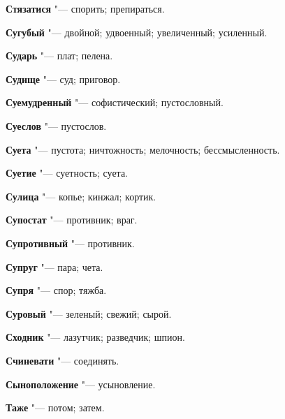 \begin{mymulticols}{2}
\noindent\textbf{Стязатися} "--- спорить; препираться. 




\noindent\textbf{Сугубый} "--- двойной; удвоенный; увеличенный; усиленный. 




\noindent\textbf{Сударь} "--- плат; пелена. 




\noindent\textbf{Судище} "--- суд; приговор. 




\noindent\textbf{Суемудренный} "--- софистический; пустословный. 




\noindent\textbf{Суеслов} "--- пустослов. 




\noindent\textbf{Суета} "--- пустота; ничтожность; мелочность; бессмысленность. 




\noindent\textbf{Суетие} "--- суетность; суета. 




\noindent\textbf{Сулица} "--- копье; кинжал; кортик. 




\noindent\textbf{Супостат} "--- противник; враг. 




\noindent\textbf{Супротивный} "--- противник. 




\noindent\textbf{Супруг} "--- пара; чета. 




\noindent\textbf{Супря} "--- спор; тяжба. 




\noindent\textbf{Суровый} "--- зеленый; свежий; сырой. 




\noindent\textbf{Сходник} "--- лазутчик; разведчик; шпион. 




\noindent\textbf{Счиневати} "--- соединять. 




\noindent\textbf{Сыноположение} "--- усыновление. 









\noindent\textbf{Таже} "--- потом; затем. 





\end{mymulticols}
